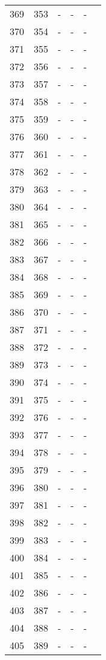\begin{longtable}{rrrrrr}
  369 & 353 & - & - & - &  \\ 
  370 & 354 & - & - & - &  \\ 
  371 & 355 & - & - & - &  \\ 
  372 & 356 & - & - & - &  \\ 
  373 & 357 & - & - & - &  \\ 
  374 & 358 & - & - & - &  \\ 
  375 & 359 & - & - & - &  \\ 
  376 & 360 & - & - & - &  \\ 
  377 & 361 & - & - & - &  \\ 
  378 & 362 & - & - & - &  \\ 
  379 & 363 & - & - & - &  \\ 
  380 & 364 & - & - & - &  \\ 
  381 & 365 & - & - & - &  \\ 
  382 & 366 & - & - & - &  \\ 
  383 & 367 & - & - & - &  \\ 
  384 & 368 & - & - & - &  \\ 
  385 & 369 & - & - & - &  \\ 
  386 & 370 & - & - & - &  \\ 
  387 & 371 & - & - & - &  \\ 
  388 & 372 & - & - & - &  \\ 
  389 & 373 & - & - & - &  \\ 
  390 & 374 & - & - & - &  \\ 
  391 & 375 & - & - & - &  \\ 
  392 & 376 & - & - & - &  \\ 
  393 & 377 & - & - & - &  \\ 
  394 & 378 & - & - & - &  \\ 
  395 & 379 & - & - & - &  \\ 
  396 & 380 & - & - & - &  \\ 
  397 & 381 & - & - & - &  \\ 
  398 & 382 & - & - & - &  \\ 
  399 & 383 & - & - & - &  \\ 
  400 & 384 & - & - & - &  \\ 
  401 & 385 & - & - & - &  \\ 
  402 & 386 & - & - & - &  \\ 
  403 & 387 & - & - & - &  \\ 
  404 & 388 & - & - & - &  \\ 
  405 & 389 & - & - & - &  \\ 

\end{longtable}
